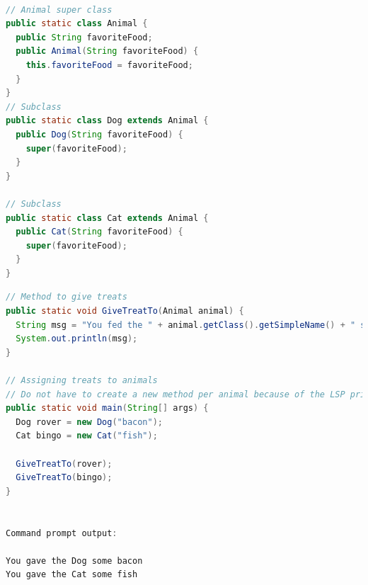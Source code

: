 \documentclass{beamer}
\begin{document}

\vspace{5mm}

\begin{lstlisting}[language=Java]

// Animal super class 
public static class Animal {
  public String favoriteFood;
  public Animal(String favoriteFood) {
    this.favoriteFood = favoriteFood;
  }
}
// Subclass
public static class Dog extends Animal {
  public Dog(String favoriteFood) {
    super(favoriteFood);
  }
}

// Subclass
public static class Cat extends Animal {
  public Cat(String favoriteFood) {
    super(favoriteFood);
  }
}
\end{lstlisting}

\vspace{5mm}



\vspace{5mm}

\begin{lstlisting}[language=Java]
// Method to give treats
public static void GiveTreatTo(Animal animal) {
  String msg = "You fed the " + animal.getClass().getSimpleName() + " some "  + animal.favoriteFood;
  System.out.println(msg);
}

// Assigning treats to animals
// Do not have to create a new method per animal because of the LSP principle
public static void main(String[] args) {
  Dog rover = new Dog("bacon");
  Cat bingo = new Cat("fish");

  GiveTreatTo(rover);
  GiveTreatTo(bingo);
}


Command prompt output:

You gave the Dog some bacon
You gave the Cat some fish
\end{lstlisting}

\end{document}
